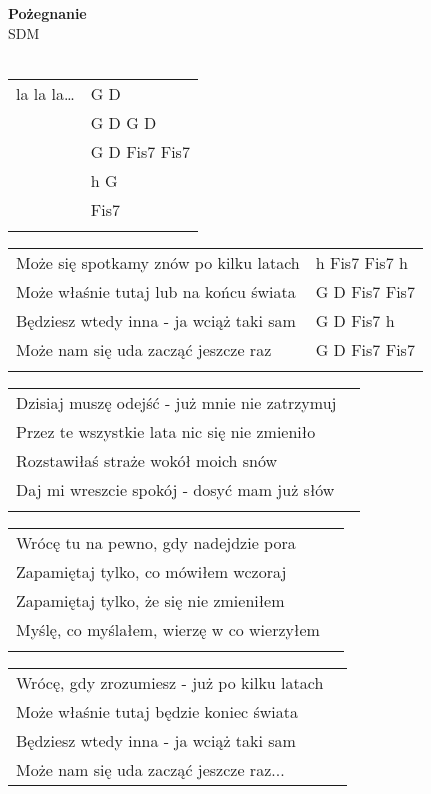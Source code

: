 \documentclass[a5paper]{article}
\begin{document}


\noindent
\fontsize{12pt}{15pt}\selectfont
\textbf{Pożegnanie} \\
\fontsize{8pt}{10pt}\selectfont
SDM \\ \\
\fontsize{10pt}{12pt}\selectfont
{}
\begin{tabular}{@{}p{7.50cm}p{3cm}@{}}
\noindent
la la la… & G D \\
 & G D G D \\
 & G D Fis7 Fis7 \\
 & h G \\
 & Fis7 \\ \\
\end{tabular}

\noindent
\begin{tabular}{@{}p{7.50cm}p{3cm}@{}}
Może się spotkamy znów po kilku latach & h Fis7 Fis7 h \\
Może właśnie tutaj lub na końcu świata & G D Fis7 Fis7 \\
Będziesz wtedy inna - ja wciąż taki sam & G D Fis7 h \\
Może nam się uda zacząć jeszcze raz & G D Fis7 Fis7 \\ \\
\end{tabular}

\noindent
\begin{tabular}{@{}p{7.50cm}p{3cm}@{}}
Dzisiaj muszę odejść - już mnie nie zatrzymuj \\
Przez te wszystkie lata nic się nie zmieniło \\
Rozstawiłaś straże wokół moich snów \\
Daj mi wreszcie spokój - dosyć mam już słów \\ \\
\end{tabular}

\noindent
\begin{tabular}{@{}p{7.50cm}p{3cm}@{}}
Wrócę tu na pewno, gdy nadejdzie pora \\
Zapamiętaj tylko, co mówiłem wczoraj \\
Zapamiętaj tylko, że się nie zmieniłem \\
Myślę, co myślałem, wierzę w co wierzyłem \\ \\
\end{tabular}

\noindent
\begin{tabular}{@{}p{7.50cm}p{3cm}@{}}
Wrócę, gdy zrozumiesz - już po kilku latach \\
Może właśnie tutaj będzie koniec świata \\ 
Będziesz wtedy inna - ja wciąż taki sam \\
Może nam się uda zacząć jeszcze raz... 
\end{tabular}
\end{document}
